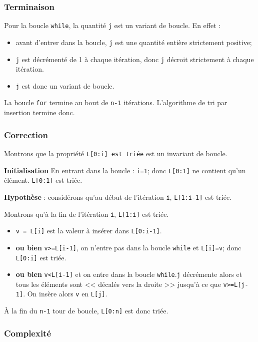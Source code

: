 \subsubsection{Terminaison}

Pour la boucle \texttt{while}, la quantité \texttt{j} est un variant de boucle. En effet :
\begin{itemize}
\item avant d'entrer dans la boucle, \texttt{j} est une quantité entière strictement positive;
\item \texttt{j} est décrémenté de 1 à chaque itération, donc \texttt{j} décroit strictement à chaque itération. 
\item \texttt{j} est donc un variant de boucle.
\end{itemize}


La boucle \texttt{for} termine au bout de \texttt{n-1} itérations. L'algorithme de tri par insertion termine donc.

\subsubsection{Correction}
Montrons que la propriété \texttt{L[0:i] est triée} est un invariant de boucle.

\textbf{Initialisation} 
En entrant dans la boucle : \texttt{i=1}; donc \texttt{L[0:1]} ne contient qu'un élément. \texttt{L[0:1]} est triée.

\textbf{Hypothèse} : considérons qu'au début de l'itération \texttt{i}, \texttt{L[1:i-1]} est triée. 

Montrons qu'à la fin de l'itération \texttt{i}, \texttt{L[1:i]} est triée. 
\begin{itemize}
\item \texttt{v = L[i]} est la valeur à insérer dans \texttt{L[0:i-1]}.
\item \textbf{ou bien} \texttt{v>=L[i-1]}, on n'entre pas dans la boucle \texttt{while} et \texttt{L[i]=v}; donc \texttt{L[0:i]} est triée. 
\item \textbf{ou bien} \texttt{v<L[i-1]} et on entre dans la boucle \texttt{while}.\texttt{j} décrémente alors et tous les éléments sont << décalés vers la droite >>  jusqu'à ce que \texttt{v>=L[j-1]}. On insère alors \texttt{v} en \texttt{L[j]}.
\end{itemize}

À la fin du \texttt{n-1} tour de boucle, \texttt{L[0:n]} est donc triée. 


\subsubsection{Complexité}

